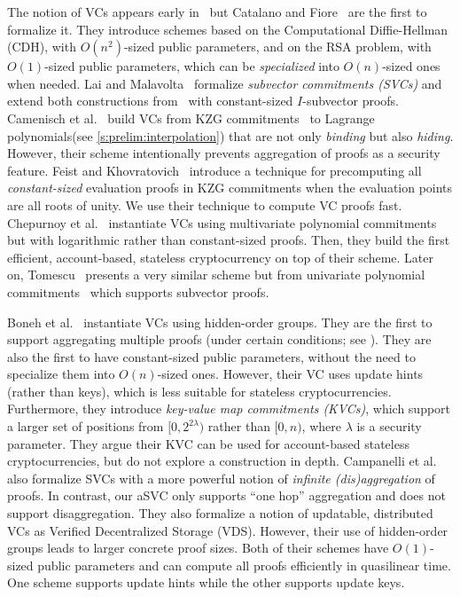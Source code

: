 The notion of VCs appears early in~\cite{CFM08,LY10,KZG10a} but Catalano and Fiore~\cite{CF13} are the first to formalize it.
They introduce schemes based on the Computational Diffie-Hellman (CDH), with $O(n^2)$-sized public parameters, and on the RSA problem, with $O(1)$-sized public parameters, which can be \textit{specialized} into $O(n)$-sized ones when needed.
Lai and Malavolta~\cite{LM19} formalize \textit{subvector commitments (SVCs)} and extend both constructions from~\cite{CF13} with constant-sized $I$-subvector proofs.
Camenisch et al.~\cite{CDHK15} build VCs from KZG commitments~\cite{KZG10a} to Lagrange polynomials\ifNotCameraReady\xspace(see \cref{s:prelim:interpolation})\fi\xspace that are not only \textit{binding} but also \textit{hiding}.
However, their scheme intentionally prevents aggregation of proofs as a security feature.
Feist and Khovratovich~\cite{FK20} introduce a technique for precomputing all \textit{constant-sized} evaluation proofs in KZG commitments when the evaluation points are all roots of unity.
We use their technique to compute VC proofs fast.
Chepurnoy et al.~\cite{CPZ18} instantiate VCs using multivariate polynomial commitments~\cite{PST13} but with logarithmic rather than constant-sized proofs.
Then, they build the first efficient, account-based, stateless cryptocurrency on top of their scheme.
Later on, Tomescu~\cite{Tomescu20} presents a very similar scheme but from univariate polynomial commitments~\cite{KZG10a} which supports subvector proofs.

Boneh et al.~\cite{BBF19} instantiate VCs using hidden-order groups.
They are the first to support aggregating multiple proofs (under certain conditions\ifNotCameraReady; see \cite[Sec. 5.2, p. 20]{BBF18}\fi).
They are also the first to have constant-sized public parameters, without the need to specialize them into $O(n)$-sized ones.
However, their VC uses update hints (rather than keys), which is less suitable for stateless cryptocurrencies.
\ifNotCameraReady
Furthermore, they introduce \textit{key-value map commitments (KVCs)}, which support a larger set of positions from $[0, 2^{2\lambda})$ rather than $[0,n)$, where $\lambda$ is a security parameter.
They argue their KVC can be used for account-based stateless cryptocurrencies, but do not explore a construction in depth.
\fi
Campanelli et al.~\cite{CFG+20} also formalize SVCs with a more powerful notion of \textit{infinite (dis)aggregation} of proofs.
In contrast, our aSVC only supports ``one hop'' aggregation and does not support disaggregation.
They also formalize a notion of updatable, distributed VCs as Verified Decentralized Storage (VDS).
However, their use of hidden-order groups leads to larger concrete proof sizes.
\ifNotCameraReady
Both of their schemes have $O(1)$-sized public parameters and can compute all proofs efficiently in quasilinear time.
One scheme supports update hints while the other supports update keys.
\fi


